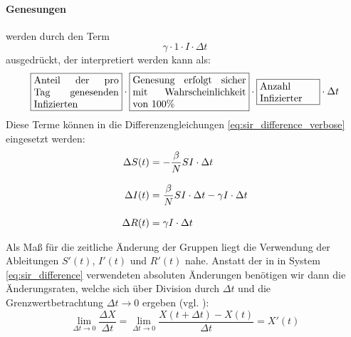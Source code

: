 \documentclass[../main.tex]{subfiles}
\begin{document}
        \paragraph{Genesungen} werden durch den Term
        \begin{equation*}
            \gamma \cdot 1 \cdot I \cdot \Delta t
        \end{equation*}
        ausgedrückt, der interpretiert werden kann als:
        \begin{equation*}
            \fbox{\parbox{3cm}{Anteil der pro Tag genesenden Infizierten}}
            \cdot
            \fbox{\parbox{4cm}{Genesung erfolgt sicher mit Wahrscheinlichkeit von 100\%}}
            \cdot
            \fbox{\parbox{2cm}{Anzahl \\Infizierter}}
            \cdot
            \Delta t
        \end{equation*}
        Diese Terme können in die Differenzengleichungen \eqref{eq:sir_difference_verbose} eingesetzt werden:
        \begin{equation}
            \label{eq:sir_difference}
            \setlength{\jot}{0.4cm}
            \begin{aligned}
            \Delta S(t) &= - \frac{\beta}{N} S I \cdot \Delta t \\
            \Delta I(t) &= \frac{\beta}{N} S I \cdot \Delta t - \gamma I \cdot \Delta t \\
            \Delta R(t) &= \gamma I \cdot \Delta t
            \end{aligned}
        \end{equation}

        Als Maß für die zeitliche Änderung der Gruppen liegt die Verwendung der Ableitungen $S'(t)$, $I'(t)$ und $R'(t)$ nahe. Anstatt der in in System \eqref{eq:sir_difference} verwendeten absoluten Änderungen benötigen wir dann die Änderungsraten, welche sich über Division durch $\Delta t$ und die Grenzwertbetrachtung $\Delta t \to 0$ ergeben (vgl. \cite[S. 7]{Li18}):
        \begin{equation}
            \label{eq:differential}
            \lim \limits_{\Delta t \to 0} \frac{\Delta X}{\Delta t}
            = \lim \limits_{\Delta t \to 0} \frac{X(t+\Delta t) - X(t)}{\Delta t}
            = X'(t)
        \end{equation}
  
\end{document}
